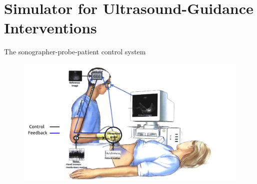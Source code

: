 \section{Simulator for Ultrasound-Guidance Interventions}


{
\begin{frame}{The sonographer-probe-patient control system}
      \begin{figure}
        \centering
        \includegraphics[width=1.0\textwidth]{./figures/sonographer-probe-patient/versions/drawing-v00.png}
      \end{figure}
\end{frame}
}


